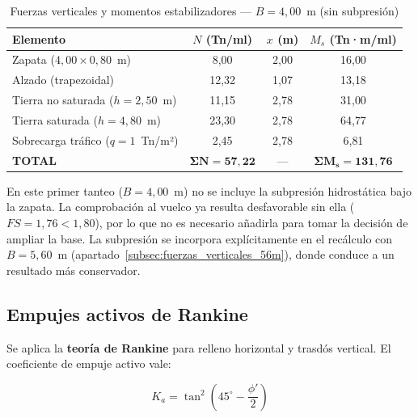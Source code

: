 \begin{table}[H]
  \centering
  \caption{Fuerzas verticales y momentos estabilizadores — $B = 4{,}00$~m (sin subpresión)}
  \label{tab:fuerzas_verticales_4m}
  \begin{tabular}{@{}lccc@{}}
    \toprule
    \textbf{Elemento} & $N$ \textbf{(Tn/ml)} & $x$ \textbf{(m)} & $M_s$ \textbf{(Tn·m/ml)} \\
    \midrule
    Zapata ($4{,}00 \times 0{,}80$~m)          & 8{,}00  & 2{,}00 & 16{,}00 \\
    Alzado (trapezoidal)                          & 12{,}32 & 1{,}07 & 13{,}18 \\
    Tierra no saturada ($h = 2{,}50$~m)         & 11{,}15 & 2{,}78 & 31{,}00 \\
    Tierra saturada ($h = 4{,}80$~m)            & 23{,}30 & 2{,}78 & 64{,}77 \\
    Sobrecarga tráfico ($q = 1$~Tn/m²)          & 2{,}45  & 2{,}78 &  6{,}81 \\
    \midrule
    \textbf{TOTAL} & $\mathbf{\Sigma N = 57{,}22}$ & — & $\mathbf{\Sigma M_s = 131{,}76}$ \\
    \bottomrule
  \end{tabular}
\end{table}

\begin{notabox}
  En este primer tanteo ($B = 4{,}00$~m) no se incluye la subpresión
  hidrostática bajo la zapata. La comprobación al vuelco ya resulta
  desfavorable sin ella ($FS = 1{,}76 < 1{,}80$), por lo que no es
  necesario añadirla para tomar la decisión de ampliar la base. La
  subpresión se incorpora explícitamente en el recálculo con
  $B = 5{,}60$~m (apartado~\ref{subsec:fuerzas_verticales_56m}), donde
  conduce a un resultado más conservador.
\end{notabox}

\subsection{Empujes activos de Rankine}
\label{subsec:empujes_rankine_opc}

Se aplica la \textbf{teoría de Rankine} para relleno horizontal y trasdós
vertical. El coeficiente de empuje activo vale:

\begin{equation}
  K_a = \tan^2\!\left(45^\circ - \frac{\phi'}{2}\right)
  \label{eq:ka_opc}
\end{equation}

